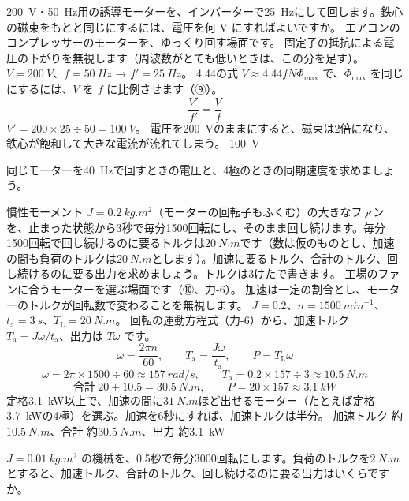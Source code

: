 \label{ph:電-12:ex12}
\begin{phreidai}[インバーターの $V/f$ 一定]
\qty{200}{V}・\qty{50}{Hz}用の誘導モーターを、インバーターで\qty{25}{Hz}にして回します。鉄心の磁束をもとと同じにするには、電圧を何 V にすればよいですか。
\phbamen
エアコンのコンプレッサーのモーターを、ゆっくり回す場面です。
\phmushi
固定子の抵抗による電圧の下がりを無視します（周波数がとても低いときは、この分を足す）。
\phzu
$V=\qty{200}{V}$、$f=\qty{50}{Hz}$ → $f'=\qty{25}{Hz}$。
\phriyu
4.44の式 $V\approx4.44fN\Phi_{\max}$ で、$\Phi_{\max}$ を同じにするには、$V$ を $f$ に比例させます（⑨）。
\phtateru
\[\frac{V'}{f'}=\frac{V}{f}\]
\phtoku
$V'=200\times25\div50=\qty{100}{V}$。
\phtashikame
電圧を\qty{200}{V}のままにすると、磁束は2倍になり、鉄心が飽和して大きな電流が流れてしまう。
\kotae \qty{100}{V}
\end{phreidai}
\begin{jibun}
同じモーターを\qty{40}{Hz}で回すときの電圧と、4極のときの同期速度を求めましょう。
\end{jibun}

\label{ph:電-12:ex13}
\begin{phreidai}[ファンのモーターを選ぶ]
慣性モーメント $J=\qty{0.2}{kg.m^2}$（モーターの回転子もふくむ）の大きなファンを、止まった状態から3秒で毎分1500回転にし、そのまま回し続けます。毎分1500回転で回し続けるのに要るトルクは$\qty{20}{N.m}$です（数は仮のものとし、加速の間も負荷のトルクは$\qty{20}{N.m}$とします）。加速に要るトルク、合計のトルク、回し続けるのに要る出力を求めましょう。トルクは3けたで書きます。
\phbamen
工場のファンに合うモーターを選ぶ場面です（⑩、力-6）。
\phmushi
加速は一定の割合とし、モーターのトルクが回転数で変わることを無視します。
\phzu
$J=0.2$、$n=\qty{1500}{min^{-1}}$、$t_{\mathrm a}=\qty{3}{s}$、$T_{\mathrm L}=\qty{20}{N.m}$。
\phriyu
回転の運動方程式（力-6）から、加速トルク $T_{\mathrm a}=J\omega/t_{\mathrm a}$、出力は $T\omega$ です。
\phtateru
\[\omega=\frac{2\pi n}{60},\qquad T_{\mathrm a}=\frac{J\omega}{t_{\mathrm a}},\qquad P=T_{\mathrm L}\omega\]
\phtoku
\[\omega=2\pi\times1500\div60\approx\qty{157}{rad/s},\qquad T_{\mathrm a}=0.2\times157\div3\approx\qty{10.5}{N.m}\]
\[\text{合計}\ 20+10.5=\qty{30.5}{N.m},\qquad P=20\times157\approx\qty{3.1}{kW}\]
\phtashikame
定格\qty{3.1}{kW}以上で、加速の間に$\qty{31}{N.m}$ほど出せるモーター（たとえば定格\qty{3.7}{kW}の4極）を選ぶ。加速を6秒にすれば、加速トルクは半分。
\kotae 加速トルク 約$\qty{10.5}{N.m}$、合計 約$\qty{30.5}{N.m}$、出力 約\qty{3.1}{kW}
\end{phreidai}
\begin{jibun}
$J=\qty{0.01}{kg.m^2}$ の機械を、0.5秒で毎分3000回転にします。負荷のトルクを$\qty{2}{N.m}$とすると、加速トルク、合計のトルク、回し続けるのに要る出力はいくらですか。
\end{jibun}

